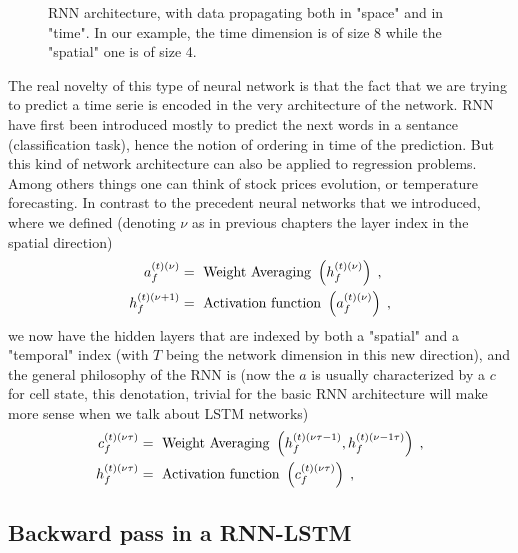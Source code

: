 \begin{figure}[H]
\begin{center}
\caption{\label{fig:RNN architecture}RNN architecture, with data propagating both in "space" and in "time". In our example, the time dimension is of size 8 while the "spatial" one is of size 4.}
\end{center}
\end{figure}

The real novelty of this type of neural network is that the fact that we are trying to predict a time serie is encoded in the very architecture of the network. RNN have first been introduced mostly to predict the next words in a sentance (classification task), hence the notion of ordering in time of the prediction. But this kind of network architecture can also be applied to regression problems. Among others things one can think of stock prices evolution, or temperature forecasting. In contrast to the precedent neural networks that we introduced, where we defined (denoting $\nu$ as in previous chapters the layer index in the spatial direction)
\begin{align}
a^{(t)(\nu)}_{f}&= \text{ Weight Averaging } \left(h^{(t)(\nu)}_{f}\right)\;,\notag\\
%
h^{(t)(\nu+1)}_{f}&= \text{ Activation function } \left(a^{(t)(\nu)}_{f}\right)\;,
\end{align}
we now have the hidden layers that are indexed by both a "spatial" and a "temporal" index (with $T$ being the network dimension in this new direction), and the general philosophy of the RNN is (now the $a$ is usually characterized by a $c$ for cell state, this denotation, trivial for the basic RNN architecture will make more sense when we talk about LSTM networks)
\begin{align}
c^{(t)(\nu \tau )}_{f}&= \text{ Weight Averaging } \left(h^{(t)(\nu \tau-1)}_{f},h^{(t)(\nu-1\tau)}_{f}\right)\;,\notag\\
%
h^{(t)(\nu\tau)}_{f}&= \text{ Activation function } \left(c^{(t)(\nu \tau)}_{f}\right)\;,
\end{align}

\subsection{Backward pass in a RNN-LSTM}

